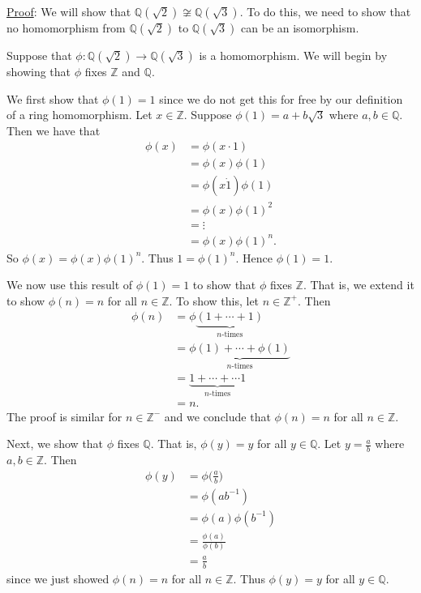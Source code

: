 \documentclass{article}
\begin{document}
\underline{Proof}: We will show that $\mathbb{Q}(\sqrt{2}) \not \cong \mathbb{Q}(\sqrt{3})$. To do this, we need to show that no homomorphism from $\mathbb{Q}(\sqrt{2})$ to $\mathbb{Q}(\sqrt{3})$ can be an isomorphism.

Suppose that $\phi : \mathbb{Q}(\sqrt{2}) \to \mathbb{Q}(\sqrt{3})$ is a homomorphism. We will begin by showing that $\phi$ fixes $\mathbb{Z}$ and $\mathbb{Q}$.

We first show that $\phi(1) = 1$ since we do not get this for free by our definition of a ring homomorphism. Let $x \in \mathbb{Z}$. Suppose $\phi(1) = a + b\sqrt{3}$ where $a, b \in \mathbb{Q}$. Then we have that
\begin{align*}
	\phi(x) &= \phi(x \cdot 1) \\
	&= \phi(x) \phi(1) \\
	&= \phi(x \dot 1) \phi(1) \\
	&= \phi(x) \phi(1)^2 \\
	&= \vdots \\
	&= \phi(x) \phi(1)^n.
\end{align*}
So $\phi(x) = \phi(x) \phi(1)^n$. Thus $1 = \phi(1)^n$. Hence $\phi(1) = 1$. 

We now use this result of $\phi(1) = 1$ to show that $\phi$ fixes $\mathbb{Z}$. That is, we extend it to show $\phi(n) = n$ for all $n \in \mathbb{Z}$. To show this, let $n \in \mathbb{Z^+}$. Then
\begin{align*}
	\phi(n) &= \phi \underbrace{(1 + \cdots + 1)}_{n \text {-times}} \\
	&= \underbrace{\phi(1) + \cdots + \phi(1)}_{n \text {-times}} \\
	&= \underbrace{1 + \cdots + \cdots 1}_{n \text {-times}} \\
	&= n.
\end{align*}
The proof is similar for $n \in \mathbb{Z^-}$ and we conclude that $\phi(n) = n$ for all $n \in \mathbb{Z}$.

Next, we show that $\phi$ fixes $\mathbb{Q}$. That is, $\phi(y) = y$ for all $y \in \mathbb{Q}$. Let $y = \frac ab$ where $a, b \in \mathbb{Z}$. Then 
\begin{align*}
	\phi(y) &= \phi\big(\frac ab\big) \\
	&= \phi(ab^{-1}) \\
	&= \phi(a) \phi(b^{-1}) \\
	&= \frac{\phi(a)}{\phi(b)} \\
	&= \frac ab
\end{align*}
since we just showed $\phi(n) = n$ for all $n \in \mathbb{Z}$. Thus $\phi(y) = y$ for all $y \in \mathbb{Q}$.
\end{document}
